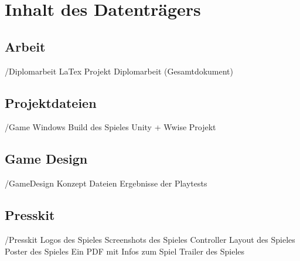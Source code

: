 \chapter{Inhalt des Datenträgers}

\section{Arbeit}
\begin{FileList}{/Diplomarbeit}
	 LaTex Projekt
	 Diplomarbeit (Gesamtdokument)
\end{FileList}

\section{Projektdateien}
\begin{FileList}{/Game}
	 Windows Build des Spieles
	 Unity + Wwise Projekt
\end{FileList}

\section{Game Design}
\begin{FileList}{/GameDesign}
	 Konzept Dateien
	 Ergebnisse der Playtests
\end{FileList}
 
\section{Presskit}
\begin{FileList}{/Presskit}
	 Logos des Spieles
	 Screenshots des Spieles
	 Controller Layout des Spieles
	 Poster des Spieles
	 Ein PDF mit Infos zum Spiel
	 Trailer des Spieles
\end{FileList}
